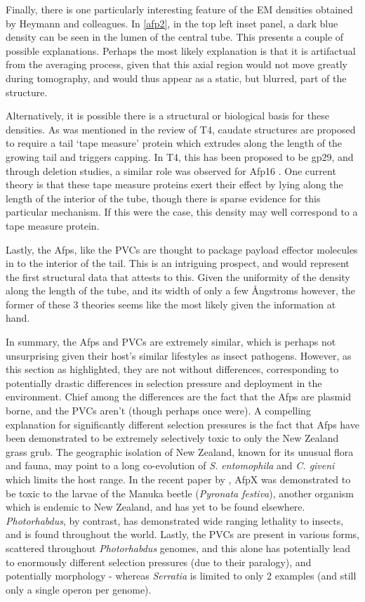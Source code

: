 Finally, there is one particularly interesting feature of the EM densities obtained by Heymann and colleagues. In \vref{afp2}, in the top left inset panel, a dark blue density can be seen in the lumen of the central tube. This presents a couple of possible explanations. Perhaps the most likely explanation is that it is artifactual from the averaging process, given that this axial region would not move greatly during tomography, and would thus appear as a static, but blurred, part of the structure.

Alternatively, it is possible there is a structural or biological basis for these densities. As was mentioned in the review of T4, caudate structures are proposed to require a tail `tape measure' protein which extrudes along the length of the growing tail and triggers capping. In T4, this has been proposed to be gp29, and through deletion studies, a similar role was observed for Afp16 \citep{Rybakova2013, Abuladze1994, Katsura1987}. One current theory is that these tape measure proteins exert their effect by lying along the length of the interior of the tube, though there is sparse evidence for this particular mechanism. If this were the case, this density may well correspond to a tape measure protein.

Lastly, the Afps, like the PVCs are thought to package payload effector molecules in to the interior of the tail. This is an intriguing prospect, and would represent the first structural data that attests to this. Given the uniformity of the density along the length of the tube, and its width of only a few \AA{}ngstroms however, the former of these 3 theories seems like the most likely given the information at hand.

In summary, the Afps and PVCs are extremely similar, which is perhaps not unsurprising given their host's similar lifestyles as insect pathogens. However, as this section as highlighted, they are not without differences, corresponding to potentially drastic differences in selection pressure and deployment in the environment. Chief among the differences are the fact that the Afps are plasmid borne, and the PVCs aren't (though perhaps once were). A compelling explanation for significantly different selection pressures is the fact that Afps have been demonstrated to be extremely selectively toxic to only the New Zealand grass grub. The geographic isolation of New Zealand, known for its unusual flora and fauna, may point to a long co-evolution of \emph{S. entomophila} and \emph{C. giveni} which limits the host range. In the recent paper by \cite{Hurst2008}, AfpX was demonstrated to be toxic to the larvae of the Manuka beetle (\emph{Pyronata festiva}), another organism which is endemic to New Zealand, and has yet to be found elsewhere. \emph{Photorhabdus}, by contrast, has demonstrated wide ranging lethality to insects, and is found throughout the world. Lastly, the PVCs are present in various forms, scattered throughout \emph{Photorhabdus} genomes, and this alone has potentially lead to enormously different selection pressures (due to their paralogy), and potentially morphology - whereas \emph{Serratia} is limited to only 2 examples (and still only a single operon per genome).



